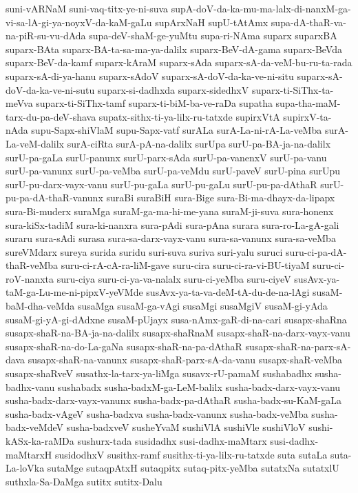 {suni-vARNaM
suni-vaq-titx-ye-ni-suva
supA-doV-da-ka-mu-ma-lalx-di-nanxM-ga-vi-sa-lA-gi-ya-noyxV-da-kaM-gaLu
supArxNaH
supU-tAtAmx
supa-dA-thaR-va-na-piR-su-vu-dAda
supa-deV-shaM-ge-yuMtu
supa-ri-NAma
suparx
suparxBA
suparx-BAta
suparx-BA-ta-sa-ma-ya-dalilx
suparx-BeV-dA-gama
suparx-BeVda
suparx-BeV-da-kamf
suparx-kAraM
suparx-sAda
suparx-sA-da-veM-bu-ru-ta-rada
suparx-sA-di-ya-hanu
suparx-sAdoV
suparx-sA-doV-da-ka-ve-ni-situ
suparx-sA-doV-da-ka-ve-ni-sutu
suparx-si-dadhxda
suparx-sidedhxV
suparx-ti-SiThx-ta-meVva
suparx-ti-SiThx-tamf
suparx-ti-biM-ba-ve-raDa
supatha
supa-tha-maM-tarx-du-pa-deV-shava
supatx-sithx-ti-ya-lilx-ru-tatxde
supirxVtA
supirxV-ta-nAda
supu-Sapx-shiVlaM
supu-Sapx-vatf
surALa
surA-La-ni-rA-La-veMba
surA-La-veM-dalilx
surA-ciRta
surA-pA-na-dalilx
surUpa
surU-pa-BA-ja-na-dalilx
surU-pa-gaLa
surU-panunx
surU-parx-sAda
surU-pa-vanenxV
surU-pa-vanu
surU-pa-vanunx
surU-pa-veMba
surU-pa-veMdu
surU-paveV
surU-pina
surUpu
surU-pu-darx-vayx-vanu
surU-pu-gaLa
surU-pu-gaLu
surU-pu-pa-dAthaR
surU-pu-pa-dA-thaR-vanunx
suraBi
suraBiH
sura-Bige
sura-Bi-ma-dhayx-da-lipapx
sura-Bi-muderx
suraMga
suraM-ga-ma-hi-me-yana
suraM-ji-suva
sura-honenx
sura-kiSx-tadiM
sura-ki-nanxra
sura-pAdi
sura-pAna
surara
sura-ro-La-gA-gali
suraru
sura-sAdi
surasa
sura-sa-darx-vayx-vanu
sura-sa-vanunx
sura-sa-veMba
sureVMdarx
sureya
surida
suridu
suri-suva
suriva
suri-yalu
suruci
suru-ci-pa-dA-thaR-veMba
suru-ci-rA-cA-ra-liM-gave
suru-cira
suru-ci-ra-vi-BU-tiyaM
suru-ci-roV-nanxta
suru-ciya
suru-ci-ya-va-nalalx
suru-ci-yeMba
suru-ciyeV
susAvx-ya-taM-ga-Lu-me-ni-pipxV-yeVMde
susAvx-ya-ta-va-deM-tA-du-de-na-lAgi
susaM-baM-dha-veMda
susaMga
susaM-ga-vAgi
susaMgi
susaMgiV
susaM-gi-yAda
susaM-gi-yA-gi-dAdxne
susaM-pUjayx
susa-nAmx-gaR-di-na-cari
susapx-shaRna
susapx-shaR-na-BA-ja-na-dalilx
susapx-shaRnaM
susapx-shaR-na-darx-vayx-vanu
susapx-shaR-na-do-La-gaNa
susapx-shaR-na-pa-dAthaR
susapx-shaR-na-parx-sA-dava
susapx-shaR-na-vanunx
susapx-shaR-parx-sA-da-vanu
susapx-shaR-veMba
susapx-shaRveV
susathx-la-tarx-ya-liMga
susavx-rU-pamaM
sushabadhx
susha-badhx-vanu
sushabadx
susha-badxM-ga-LeM-balilx
susha-badx-darx-vayx-vanu
susha-badx-darx-vayx-vanunx
susha-badx-pa-dAthaR
susha-badx-su-KaM-gaLa
susha-badx-vAgeV
susha-badxva
susha-badx-vanunx
susha-badx-veMba
susha-badx-veMdeV
susha-badxveV
susheYvaM
sushiVlA
sushiVle
sushiVloV
sushi-kASx-ka-raMDa
sushurx-tada
susidadhx
susi-dadhx-maMtarx
susi-dadhx-maMtarxH
susidodhxV
susithx-ramf
susithx-ti-ya-lilx-ru-tatxde
suta
sutaLa
suta-La-loVka
sutaMge
sutaqpAtxH
sutaqpitx
sutaq-pitx-yeMba
sutatxNa
sutatxlU
suthxla-Sa-DaMga
sutitx
sutitx-Dalu
}

